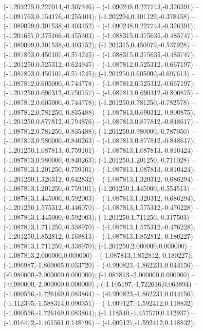  (-1.203225,0.227014,-0.307346) -- (-1.090248,0.227743,-0.326391) -- (-1.091763,0.154176,-0.255404);
 (-1.202294,0.301129,-0.378458) -- (-1.089099,0.301538,-0.403152) -- (-1.090248,0.227743,-0.326391);
 (-1.201657,0.375466,-0.455303) -- (-1.088315,0.375635,-0.485747) -- (-1.089099,0.301538,-0.403152);
 (-1.201315,0.450079,-0.537928) -- (-1.087893,0.450107,-0.574245) -- (-1.088315,0.375635,-0.485747);
 (-1.201250,0.525312,-0.624945) -- (-1.087812,0.525312,-0.667197) -- (-1.087893,0.450107,-0.574245);
 (-1.201250,0.605000,-0.697613) -- (-1.087812,0.605000,-0.744778) -- (-1.087812,0.525312,-0.667197);
 (-1.201250,0.690312,-0.750157) -- (-1.087813,0.690312,-0.800875) -- (-1.087812,0.605000,-0.744778);
 (-1.201250,0.781250,-0.782578) -- (-1.087812,0.781250,-0.835488) -- (-1.087813,0.690312,-0.800875);
 (-1.201250,0.877812,-0.794876) -- (-1.087813,0.877812,-0.848617) -- (-1.087812,0.781250,-0.835488);
 (-1.201250,0.980000,-0.787050) -- (-1.087813,0.980000,-0.840263) -- (-1.087813,0.877812,-0.848617);
 (-1.201250,1.087813,-0.759101) -- (-1.087813,1.087813,-0.810424) -- (-1.087813,0.980000,-0.840263);
 (-1.201250,1.201250,-0.711028) -- (-1.087813,1.201250,-0.759101) -- (-1.087813,1.087813,-0.810424);
 (-1.201250,1.320312,-0.642832) -- (-1.087813,1.320312,-0.686294) -- (-1.087813,1.201250,-0.759101);
 (-1.201250,1.445000,-0.554513) -- (-1.087813,1.445000,-0.592003) -- (-1.087813,1.320312,-0.686294);
 (-1.201250,1.575312,-0.446070) -- (-1.087813,1.575312,-0.476228) -- (-1.087813,1.445000,-0.592003);
 (-1.201250,1.711250,-0.317503) -- (-1.087813,1.711250,-0.338970) -- (-1.087813,1.575312,-0.476228);
 (-1.201250,1.852812,-0.168813) -- (-1.087813,1.852812,-0.180227) -- (-1.087813,1.711250,-0.338970);
 (-1.201250,2.000000,0.000000) -- (-1.087813,2.000000,0.000000) -- (-1.087813,1.852812,-0.180227);
 (-1.096987,-1.860005,0.033720) -- (-0.990823,-1.862231,0.044156) -- (-0.980000,-2.000000,0.000000);
 (-1.087813,-2.000000,0.000000) -- (-0.980000,-2.000000,0.000000) ;
 (-1.105197,-1.722616,0.063894) -- (-1.000556,-1.726169,0.083864) -- (-0.990823,-1.862231,0.044156);
 (-1.112395,-1.588314,0.090351) -- (-1.009127,-1.592412,0.118832) -- (-1.000556,-1.726169,0.083864);
 (-1.118540,-1.457570,0.112937) -- (-1.016472,-1.461561,0.148796) -- (-1.009127,-1.592412,0.118832);
